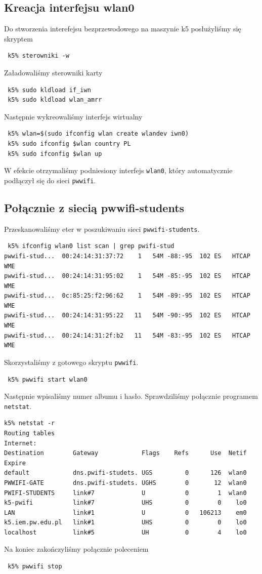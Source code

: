 \documentclass[a4paper,11pt,notitlepage]{article}
\begin{document}
\subsection{Kreacja interfejsu wlan0}

Do stworzenia interefejsu bezprzewodowego na maszynie k5 posłużyliśmy się skryptem 
\begin{verbatim}
 k5% sterowniki -w
\end{verbatim}
Załadowaliśmy sterowniki karty 
\begin{verbatim}
 k5% sudo kldload if_iwn
 k5% sudo kldload wlan_amrr
\end{verbatim}
Następnie wykreowaliśmy interfejs wirtualny
\begin{verbatim}
 k5% wlan=$(sudo ifconfig wlan create wlandev iwn0)
 k5% sudo ifconfig $wlan country PL
 k5% sudo ifconfig $wlan up
\end{verbatim}
W efekcie otrzymaliśmy podniesiony interfejs \verb+wlan0+, który automatycznie podłączył się do sieci \verb+pwwifi+.

\subsection{Połącznie z siecią pwwifi-students}

Przeskanowaliśmy eter w poszukiwaniu sieci \verb+pwwifi-students+.
\begin{verbatim}
 k5% ifconfig wlan0 list scan | grep pwifi-stud
pwwifi-stud...  00:24:14:31:37:72    1   54M -88:-95  102 ES   HTCAP WME
pwwifi-stud...  00:24:14:31:95:02    1   54M -85:-95  102 ES   HTCAP WME
pwwifi-stud...  0c:85:25:f2:96:62    1   54M -89:-95  102 ES   HTCAP WME
pwwifi-stud...  00:24:14:31:95:22   11   54M -90:-95  102 ES   HTCAP WME
pwwifi-stud...  00:24:14:31:2f:b2   11   54M -83:-95  102 ES   HTCAP WME
\end{verbatim}
Skorzystaliśmy z gotowego skryptu \verb+pwwifi+. 
\begin{verbatim}
 k5% pwwifi start wlan0
\end{verbatim}
Następnie wpisaliśmy numer albumu i hasło. Sprawdziliśmy połącznie programem \verb+netstat+.
\begin{verbatim}
k5% netstat -r
Routing tables
Internet:
Destination        Gateway            Flags    Refs      Use  Netif Expire
default            dns.pwifi-studets. UGS         0      126  wlan0
PWWIFI-GATE        dns.pwifi-studets. UGHS        0       12  wlan0
PWIFI-STUDENTS     link#7             U           0        1  wlan0
k5-pwifi           link#7             UHS         0        0    lo0
LAN                link#1             U           0   106213    em0
k5.iem.pw.edu.pl   link#1             UHS         0        0    lo0
localhost          link#5             UH          0        4    lo0
\end{verbatim}
Na koniec zakończyliśmy połącznie poleceniem
\begin{verbatim}
 k5% pwwifi stop
\end{verbatim}
\end{document}
